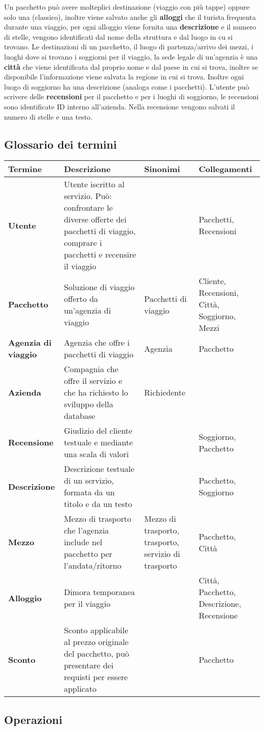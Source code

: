 %
Un pacchetto può avere molteplici destinazione (viaggio con più tappe) oppure solo una (classico), inoltre viene salvato anche gli \textbf{alloggi} che il turista frequenta durante una viaggio, per ogni alloggio viene fornita una \textbf{descrizione} e il numero di stelle, vengono identificati dal nome della struttura e dal luogo in cu si trovano.
%
Le destinazioni di un pacchetto, il luogo di partenza/arrivo dei mezzi, i luoghi dove si trovano i soggiorni per il viaggio, la sede legale di un'agenzia è una \textbf{città} che viene identificata dal proprio nome e dal paese in cui si trova, inoltre se disponibile l'informazione viene salvata la regione in cui si trova. Inoltre ogni luogo di soggiorno ha una descrizione (analoga come i pacchetti).
%
L'utente può scrivere delle \textbf{recensioni} per il pacchetto e per i luoghi di soggiorno, le recensioni sono identificate ID interno all'azienda. Nella recensione vengono salvati il numero di stelle e una testo.
%
\subsection{Glossario dei termini}
\begin{tabularx}{\textwidth}{p{} X p{} p{}}
    \toprule
    \textbf{Termine} & \textbf{Descrizione} & \textbf{Sinonimi} & \textbf{Collegamenti} \\
    \midrule
    \textbf{Utente} & Utente iscritto al servizio. Può: confrontare le diverse offerte dei pacchetti di viaggio, comprare i pacchetti e recensire il viaggio & & Pacchetti, Recensioni
    \\\midrule
    \textbf{Pacchetto} & Soluzione di viaggio offerto da un'agenzia di viaggio & Pacchetti di viaggio & Cliente, Recensioni, Città, Soggiorno, Mezzi
    \\\midrule
    \textbf{Agenzia di viaggio} & Agenzia che offre i pacchetti di viaggio & Agenzia & Pacchetto
    \\\midrule
    \textbf{Azienda} & Compagnia che offre il servizio e che ha richiesto lo sviluppo della database & Richiedente &
    \\\midrule
    \textbf{Recensione} & Giudizio del cliente testuale e mediante una scala di valori & & Soggiorno, Pacchetto
    \\\midrule
    \textbf{Descrizione} & Descrizione testuale di un servizio, formata da un titolo e da un testo & & Pacchetto, Soggiorno
    \\\midrule
    \textbf{Mezzo} & Mezzo di trasporto che l'agenzia include nel pacchetto per l'andata/ritorno & Mezzo di trasporto, trasporto, servizio di trasporto & Pacchetto, Città
    \\\midrule
    \textbf{Alloggio} & Dimora temporanea per il viaggio & & Città, Pacchetto, Descrizione, Recensione
    \\\midrule
    \textbf{Sconto} & Sconto applicabile al prezzo originale del pacchetto, può presentare dei requisti per essere applicato & & Pacchetto
    \\
    \bottomrule
\end{tabularx}

\subsection{Operazioni}

